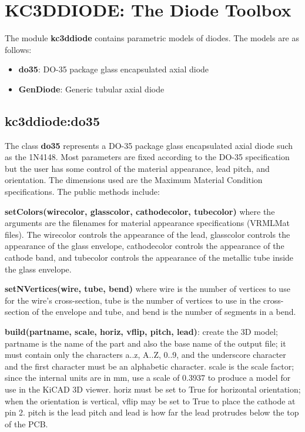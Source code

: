 \section{KC3DDIODE: The Diode Toolbox}
The module \textbf{kc3ddiode} contains parametric models
of diodes. The models are as follows:

\begin{itemize}
\item \textbf{do35}: DO-35 package glass encapsulated axial diode
\item \textbf{GenDiode}: Generic tubular axial diode
\end{itemize}

\subsection{kc3ddiode:do35}
The class \textbf{do35} represents a DO-35 package glass encapsulated
axial diode such as the 1N4148. Most parameters are fixed according
to the DO-35 specification but the user has some control of the
material appearance, lead pitch, and orientation. The dimensions used
are the Maximum Material Condition specifications. The public methods
include:

\textbf{setColors(wirecolor, glasscolor, cathodecolor, tubecolor)}
where the arguments are the filenames for material appearance specifications
(VRMLMat files). The wirecolor controls the appearance of the lead,
glasscolor controls the appearance of the glass envelope,
cathodecolor controls the appearance of the cathode band, and
tubecolor controls the appearance of the metallic tube inside the
glass envelope.

\textbf{setNVertices(wire, tube, bend)} where wire is the number of
vertices to use for the wire's cross-section, tube is the number of
vertices to use in the cross-section of the envelope and tube,
and bend is the number of segments in a bend.

\textbf{build(partname, scale, horiz, vflip, pitch, lead)}: create the
3D model; partname is the name of the part and also the base name of the
output file; it must contain only the characters a..z, A..Z, 0..9, and the 
underscore character and the first character must be an alphabetic character.
scale is the scale factor; since the internal units are in mm, use a scale of
0.3937 to produce a model for use in the KiCAD 3D viewer. horiz must be set to
True for horizontal orientation; when the orientation is vertical, vflip may
be set to True to place the cathode at pin 2. pitch is the lead pitch and
lead is how far the lead protrudes below the top of the PCB.

